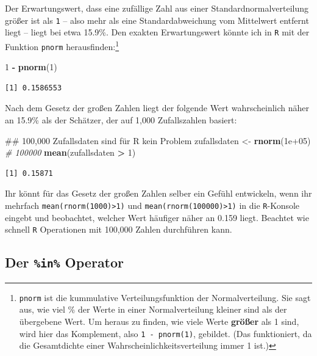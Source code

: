 \documentclass[12pt,]{tufte-book}
\newenvironment{Shaded}{\begin{snugshade}}{\end{snugshade}}
\newcommand{\KeywordTok}[1]{\textcolor[rgb]{0.13,0.29,0.53}{\textbf{#1}}}
\newcommand{\DecValTok}[1]{\textcolor[rgb]{0.00,0.00,0.81}{#1}}
\newcommand{\FloatTok}[1]{\textcolor[rgb]{0.00,0.00,0.81}{#1}}
\newcommand{\StringTok}[1]{\textcolor[rgb]{0.31,0.60,0.02}{#1}}
\newcommand{\CommentTok}[1]{\textcolor[rgb]{0.56,0.35,0.01}{\textit{#1}}}
\newcommand{\OperatorTok}[1]{\textcolor[rgb]{0.81,0.36,0.00}{\textbf{#1}}}
\newcommand{\NormalTok}[1]{#1}
\theoremstyle{definition}
\theoremstyle{definition}
\theoremstyle{definition}
\theoremstyle{remark}
\begin{document}
Der Erwartungswert, dass eine zufällige Zahl aus einer
Standardnormalverteilung größer ist als \texttt{1} -- also mehr als eine
Standardabweichung vom Mittelwert entfernt liegt -- liegt bei etwa
15.9\%. Den exakten Erwartungswert könnte ich in \texttt{R} mit der
Funktion \texttt{pnorm} herausfinden:\footnote{\texttt{pnorm} ist die
  kummulative Verteilungsfunktion der Normalverteilung. Sie sagt aus,
  wie viel \% der Werte in einer Normalverteilung kleiner sind als der
  übergebene Wert. Um heraus zu finden, wie viele Werte \textbf{größer}
  als 1 sind, wird hier das Komplement, also \texttt{1\ -\ pnorm(1)},
  gebildet. (Das funktioniert, da die Gesamtdichte einer
  Wahrscheinlichkeitsverteilung immer 1 ist.)}

\begin{Shaded}
\begin{Highlighting}[]
\DecValTok{1} \OperatorTok{-}\StringTok{ }\KeywordTok{pnorm}\NormalTok{(}\DecValTok{1}\NormalTok{)}
\end{Highlighting}
\end{Shaded}

\begin{verbatim}
[1] 0.1586553
\end{verbatim}

Nach dem Gesetz der großen Zahlen liegt der folgende Wert wahrscheinlich
näher an 15.9\% als der Schätzer, der auf 1,000 Zufallszahlen basiert:

\begin{Shaded}
\begin{Highlighting}[]
\NormalTok{## 100,000 Zufallsdaten sind für R kein Problem}
\NormalTok{zufallsdaten <-}\StringTok{ }\KeywordTok{rnorm}\NormalTok{(}\FloatTok{1e+05}\NormalTok{)  }\CommentTok{# 100000}
\KeywordTok{mean}\NormalTok{(zufallsdaten }\OperatorTok{>}\StringTok{ }\DecValTok{1}\NormalTok{)}
\end{Highlighting}
\end{Shaded}

\begin{verbatim}
[1] 0.15871
\end{verbatim}

Ihr könnt für das Gesetz der großen Zahlen selber ein Gefühl entwickeln,
wenn ihr mehrfach \texttt{mean(rnorm(1000)\textgreater{}1)} und
\texttt{mean(rnorm(100000)\textgreater{}1)} in die \texttt{R}-Konsole
eingebt und beobachtet, welcher Wert häufiger näher an 0.159 liegt.
Beachtet wie schnell \texttt{R} Operationen mit 100,000 Zahlen
durchführen kann.

\subsection{\texorpdfstring{Der \texttt{\%in\%}
Operator}{Der \%in\% Operator}}\label{der-in-operator}
\end{document}
